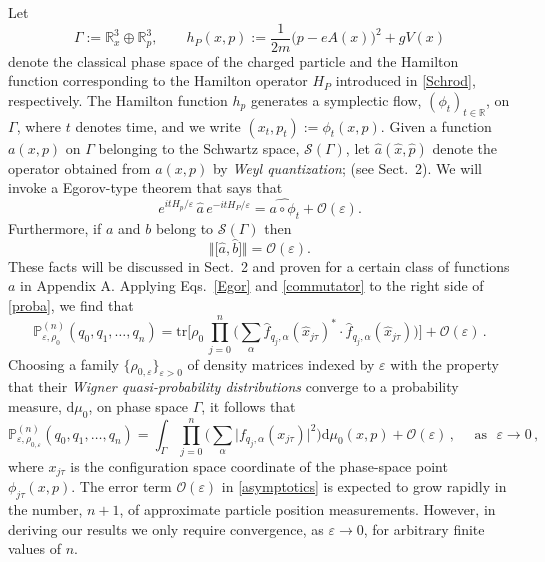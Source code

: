 \documentclass[12pt]{article}
\begin{document}
Let 
\begin{equation}\label{phase space}
\Gamma:= \mathbb{R}^{3}_x \oplus \mathbb{R}^{3}_p, \qquad h_P(x, p):= \frac{1}{2m}\big(p-eA(x)\big)^{2} + gV(x)
\end{equation}
denote the classical phase space of the charged particle and the Hamilton function corresponding to the Hamilton
operator $H_P$ introduced in \eqref{Schrod}, respectively. The Hamilton function $h_p$ generates a
symplectic flow, $(\phi_t)_{t\in \mathbb{R}}$, on $\Gamma$, where $t$ denotes time, and we write
$(x_t, p_t) := \phi_{t}(x,p)$. Given a function $a(x,p)$ on $\Gamma$ belonging to the Schwartz space, 
$\mathcal{S}(\Gamma)$, let $\widehat{a}(\hat{x}, \hat{p})$ denote the operator obtained from $a(x,p)$ by 
\textit{Weyl quantization}; (see Sect.~2). We will invoke a Egorov-type theorem that says that
\begin{equation}\label{Egor}
e^{itH_{p}/\varepsilon} \,\widehat{a} \, e^{-itH_{P}/\varepsilon} = \widehat{a \circ \phi_t} + \mathcal{O}(\varepsilon).
\end{equation}
Furthermore, if $a$ and $b$ belong to $\mathcal{S}(\Gamma)$ then
\begin{equation}\label{commutator}
\Vert \big[\widehat{a}, \widehat{b}\big] \Vert= \mathcal{O}(\varepsilon).
\end{equation}
These facts will be discussed in Sect.~2 and proven for a certain class of functions $a$ in Appendix A. Applying Eqs.~\eqref{Egor} and \eqref{commutator} to
the right side of \eqref{proba}, we find that
\begin{equation}\label{proba'}
\mathbb{P}_{\varepsilon, \rho_0}^{(n)}(q_0, q_1, \dots, q_n) = \text{tr}\Big[\rho_0\, \prod_{j=0}^{n} \Big(\sum_{\alpha} 
\widehat{f}_{q_j, \alpha}(\widehat{x}_{j\tau})^{*} \cdot \widehat{f}_{q_j, \alpha}(\widehat{x}_{j\tau})\Big) \Big]+ 
\mathcal{O}(\varepsilon)\,.
\end{equation}
Choosing a family $\big\{ \rho_{0, \varepsilon}\big\}_{\varepsilon >0}$ of density matrices indexed by $\varepsilon$ 
with the property that their \textit{Wigner quasi-probability distributions} converge to a probability measure, 
$\text{d}\mu_{0}$, on phase space $\Gamma$, it follows that
\begin{equation}\label{asymptotics}
\mathbb{P}_{\varepsilon, \rho_{0, \varepsilon}}^{(n)}(q_0, q_1, \dots, q_n) = \int_{\Gamma} \prod_{j=0}^{n} \Big(\sum_{\alpha} 
\big| f_{q_j, \alpha}(x_{j\tau})\big|^{2}\Big) 
\text{d}\mu_{0}(x,p) + \mathcal{O}(\varepsilon)\,, \quad\text{ as } \,\, \varepsilon \rightarrow 0\,,
\end{equation}
where $x_{j\tau}$ is the configuration space coordinate of the phase-space point 
$\phi_{j\tau}(x,p)$. The error term $\mathcal{O}(\varepsilon)$ in \eqref{asymptotics} is expected to grow rapidly 
in the number, $n+1$, of approximate particle position measurements. However, in deriving our results we only
require convergence, as $\varepsilon \rightarrow 0$, for arbitrary finite values of $n$.
\end{document}

